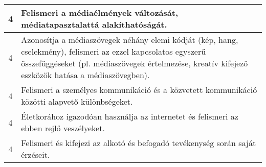 \begin{longtable}{c | p{12cm} }
                                          4 &  Felismeri a médiaélmények változását, médiatapasztalattá alakíthatóságát. \\ \hline
                                          4 &  Azonosítja a médiaszövegek néhány elemi kódját (kép, hang, cselekmény), felismeri az ezzel kapcsolatos egyszerű összefüggéseket (pl. médiaszövegek értelmezése, kreatív kifejező eszközök hatása a médiaszövegben). \\ \hline
                                          4 &  Felismeri a személyes kommunikáció és a közvetett kommunikáció közötti alapvető különbségeket. \\ \hline
                                          4 &  Életkorához igazodóan használja az internetet és felismeri az ebben rejlő veszélyeket. \\ \hline
                                          4 &  Felismeri és kifejezi az alkotó és befogadó tevékenység során saját érzéseit. \\ \hline
                                      
                        \end{longtable}
            \clearpage

